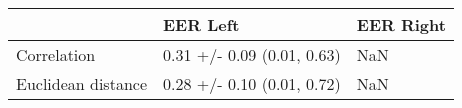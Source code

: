 \begin{tabular}{lll}
\toprule
{} &                    EER Left & EER Right \\
\midrule
Correlation        &  0.31 +/- 0.09 (0.01, 0.63) &       NaN \\
Euclidean distance &  0.28 +/- 0.10 (0.01, 0.72) &       NaN \\
\bottomrule
\end{tabular}

